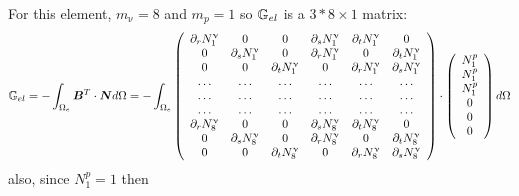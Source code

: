 For this element, $m_\upnu=8$ and $m_p=1$ so ${\mathbb{G}}_{el}$ is
a $3*8\times 1$ matrix:
\[
{\mathbb{G}}_{el} = -\int_{\Omega_e} {\bm B}^T \cdot {\bm N} d\Omega
= -\int_{\Omega_e}
\left(
\begin{array}{cccccc}
\partial_r N_1^\upnu & 0 & 0 & \partial_s N_1^\upnu  & \partial_t N_1^\upnu & 0 \\
0 & \partial_s N_1^\upnu  & 0 & \partial_r N_1^\upnu  & 0 & \partial_t N_1^\upnu \\
0 & 0 & \partial_t N_1^\upnu  & 0 & \partial_r N_1^\upnu  & \partial_s N_1^\upnu \\
\dots  & \dots & \dots  & \dots & \dots  & \dots \\
\dots  & \dots & \dots  & \dots & \dots  & \dots \\
\dots  & \dots & \dots  & \dots & \dots  & \dots \\
\partial_r N_8^\upnu & 0 & 0 & \partial_s N_8^\upnu  & \partial_t N_8^\upnu & 0 \\
0 & \partial_s N_8^\upnu  & 0 & \partial_r N_8^\upnu  & 0 & \partial_t N_8^\upnu \\
0 & 0 & \partial_t N_8^\upnu  & 0 & \partial_r N_8^\upnu  & \partial_s N_8^\upnu 
\end{array}
\right)
\cdot
\left(
\begin{array}{c}
N_1^p  \\ 
N_1^p  \\ 
N_1^p  \\ 
0 \\
0 \\
0 
\end{array}
\right)
d\Omega
\]
also, since $N_1^p=1$ then 
